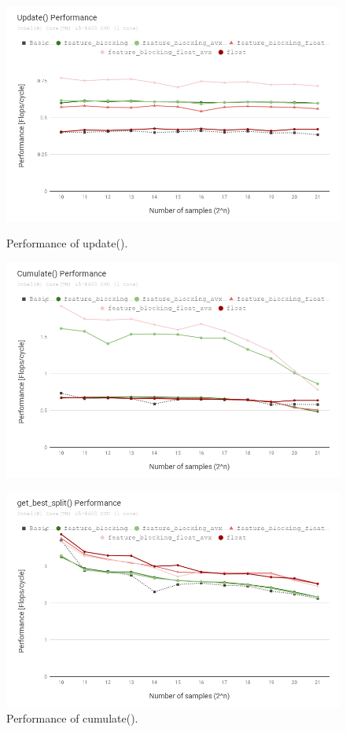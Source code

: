 
\begin{figure}[t!]
  \begin{minipage}{.45\textwidth}
      \includegraphics[width=1.0\textwidth]{fig/update.png}
      \caption{Performance of update().}
      \label{fig:update}
      \includegraphics[width=1.0\textwidth]{fig/cumulate.png}
      \caption{Performance of cumulate().}
      \label{fig:cumulate}
  \end{minipage} \quad \quad
  \begin{minipage}{.45\textwidth}
      \includegraphics[width=1.0\textwidth]{fig/gbs.png}

\end{minipage}
\end{figure}
